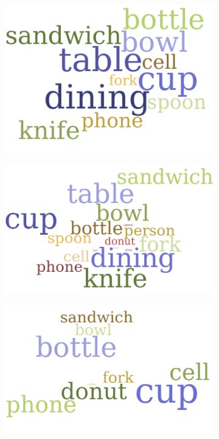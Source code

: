     \begin{figure}[H]
      \centering
      \captionsetup{justification=centering}
    
      \begin{subfigure}{0.33\textwidth}
      \includegraphics[width=\textwidth]{Sections/4InitialWork/4_images_wordcloud/yolo_pic.png} 
      \caption{}
      \end{subfigure}
      \begin{subfigure}{0.33\textwidth}
      \includegraphics[width=\textwidth]{Sections/4InitialWork/4_images_wordcloud/retina_pic.png}\hfill
      \caption{}
      \end{subfigure}
      \begin{subfigure}{0.3\textwidth}
      \includegraphics[width=\textwidth]{Sections/4InitialWork/4_images_wordcloud/tiny_yolo_pic.png}\hfill

\end{subfigure}
\end{figure}

